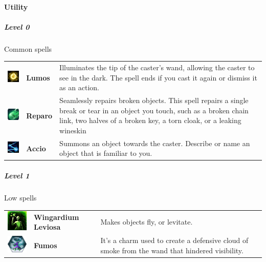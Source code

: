\paragraph{Utility} 


\subparagraph{Level 0} 
Common spells \\
\begin{tabular}{ m{2cm}m{3cm}m{8cm}} 
  \includegraphics[width=2cm]{../Pictures/Gameplay/Spells/Icon/Lumos_spell_icon.png} & \textbf{Lumos} & Illuminates the tip of the caster's wand, allowing the caster to see in the dark. The spell ends if you cast it again or dismiss it as an action.\\ 
	\includegraphics[width=2cm]{../Pictures/Gameplay/Spells/Icon/Reparo_spell_icon.png} & \textbf{Reparo} & Seamlessly repairs broken objects. This spell repairs a single break or tear in an object you touch, such as a broken chain link, two halves of a broken key, a torn cloak, or a leaking wineskin \\ 
	\includegraphics[width=2cm]{../Pictures/Gameplay/Spells/Icon/Accio_spell_icon.png} & \textbf{Accio} &  Summons an object towards the caster. Describe or name an object that is familiar to you. \\ 
\end{tabular}

\subparagraph{Level 1} 
 Low  spells\\
\begin{tabular}{ m{2cm}m{3cm}m{8cm} } 
 \includegraphics[width=2cm]{../Pictures/Gameplay/Spells/Icon/Wingardium_spell_icon.png} & \textbf{Wingardium Leviosa} & Makes objects fly, or levitate.   \\ 
	\includegraphics[width=2cm]{../Pictures/Gameplay/Spells/Icon/Fumos_spell_icon.png} & \textbf{Fumos} & It's a charm used to create a defensive cloud of smoke from the wand that hindered visibility. \\  
\end{tabular}

